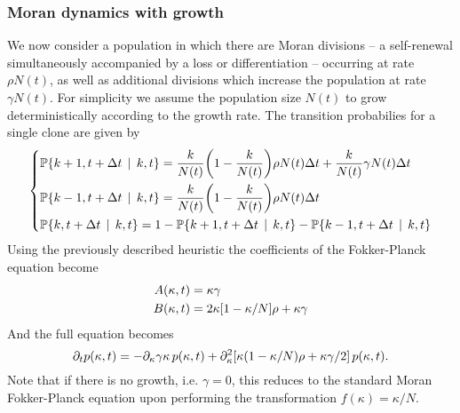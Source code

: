 \documentclass[pdftex,12pt,a4paper]{scrartcl}
\renewcommand{\P}[2]{\mathbb{P} \! \left\lbrace #1 \, \mid \, #2 \right\rbrace }
\begin{document}
\subsubsection{Moran dynamics with growth}
We now consider a population in which there are Moran divisions -- a self-renewal simultaneously accompanied by a loss or differentiation -- occurring at rate $\rho N(t)$, as well as additional divisions which increase the population at rate $\gamma N(t)$. For simplicity we assume the population size $N(t)$ to grow deterministically according to the growth rate. The transition probabilies for a single clone are given by
\begin{equation}
\left\lbrace
    \begin{aligned}
        &\P{k+1, t+\Delta t}{k, t} = \frac{k}{N(t)}\qty(1 - \frac{k}{N(t)})\rho N(t)\Delta t + \frac{k}{N(t)}\gamma N(t)\Delta t\\
        &\P{k-1, t+\Delta t}{k, t} = \frac{k}{N(t)}\qty(1 - \frac{k}{N(t)})\rho N(t)\Delta t \\
        &\P{k, t+\Delta t}{k, t} = 1 - \P{k+1, t+\Delta t}{k, t} - \P{k-1, t+\Delta t}{k, t}
    \end{aligned}
\right.
\end{equation}
Using the previously described heuristic the coefficients of the Fokker-Planck equation become
\begin{equation}
    \begin{aligned}
        A(\kappa,t) &= \kappa \gamma \\
        B(\kappa,t) &= 2 \kappa \qty[1 - \kappa/N ]\rho + \kappa \gamma
    \end{aligned}
\end{equation}
And the full equation becomes
\begin{equation}\label{eq:FPSingleGrowth}
    \partial_t p(\kappa,t) = -\partial_\kappa \gamma \kappa \, p(\kappa,t) + \partial_\kappa^2 \qty[\kappa(1-\kappa/N)\rho + \kappa \gamma/2] \, p(\kappa,t).
\end{equation}
Note that if there is no growth, i.e. $\gamma = 0$, this reduces to the standard Moran Fokker-Planck equation upon performing the transformation $f(\kappa) = \kappa/N$.
\end{document}
